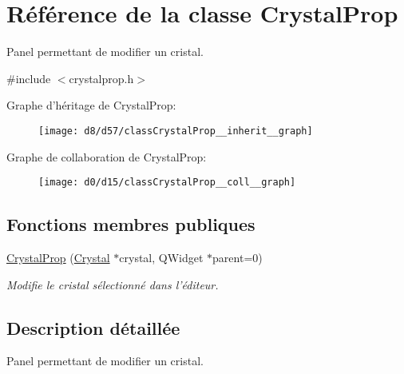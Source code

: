 \hypertarget{classCrystalProp}{\section{Référence de la classe Crystal\+Prop}
\label{classCrystalProp}
}


Panel permettant de modifier un cristal.  




{\ttfamily \#include $<$crystalprop.\+h$>$}



Graphe d'héritage de Crystal\+Prop\+:\nopagebreak
\begin{figure}[H]
\begin{center}
\leavevmode
\texttt{[image: d8/d57/classCrystalProp\_\_inherit\_\_graph]}
\end{center}
\end{figure}


Graphe de collaboration de Crystal\+Prop\+:\nopagebreak
\begin{figure}[H]
\begin{center}
\leavevmode
\texttt{[image: d0/d15/classCrystalProp\_\_coll\_\_graph]}
\end{center}
\end{figure}
\subsection*{Fonctions membres publiques}
\begin{DoxyCompactItemize}
\item 
\hyperlink{classCrystalProp_a47068eadccacdada66efdec58235ce94}{Crystal\+Prop} (\hyperlink{classCrystal}{Crystal} $\ast$crystal, Q\+Widget $\ast$parent=0)
\begin{DoxyCompactList}\small\item\em Modifie le cristal sélectionné dans l’éditeur. \end{DoxyCompactList}\end{DoxyCompactItemize}


\subsection{Description détaillée}
Panel permettant de modifier un cristal. 

